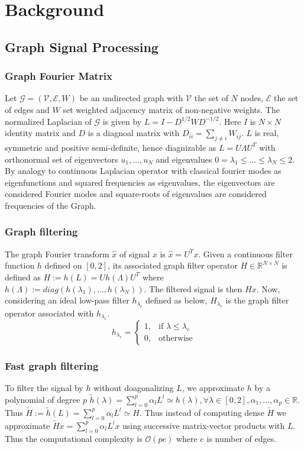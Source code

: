 \documentclass[10pt,a4paper, nocenter]{report}
\theoremstyle{definition}
\begin{document}
	\chapter{Background}
	\section{Graph Signal Processing}
	\subsection*{Graph Fourier Matrix}
	Let $\mathcal{G} = (\mathcal{V},\mathcal{E}, W)$ be an undirected graph with $\mathcal{V}$ the set of $N$ nodes, $\mathcal{E}$ the set of edges and $W$ set weighted adjacency matrix of non-negative weights. The normalized Laplacian of $\mathcal{G}$ is given by $L=I-D^{1/2}WD^{-1/2}$. Here $I$ is $N\times N$ identity matrix and $D$ is a diagnoal matrix with $D_{ii} = \sum_{j\neq i}W_{ij}$. $L$ is real, symmetric and positive semi-definite, hence diagnizable as $L=U\Lambda U^T$ with orthonormal set of eigenvectors $u_1,\dots,u_N$ and eigenvalues $0=\lambda_1 \le \dots \le \lambda_N \le 2$. By analogy to continuous Laplacian operator with classical fourier modes as eigenfunctions and squared frequencies as eigenvalues, the eigenvectors are considered Fourier modes and square-roots of eigenvalues are considered frequencies of the Graph. 

	\subsection*{Graph filtering}
	The graph Fourier transform $\hat{x}$ of signal $x$ is $\hat{x} = U^Tx$. Given a continuous filter function $h$ defined on $[0,2]$, its associated graph filter operator $H\in \mathbb{R}^{N \times N}$ is defined as $H := h(L) = Uh(\Lambda)U^T$ where $h(\Lambda):=diag(h(\lambda_1), \dots, h(\lambda_N))$. The filtered signal is then $Hx$. Now, considering an ideal low-pass filter $h_{\lambda_c}$ defined as below, $H_{\lambda_c}$ is the graph filter operator associated with $h_{\lambda_c}$. 
	$$h_{\lambda_c} =  \begin{cases}1, &\text{if }\lambda \le \lambda_c \\ 0, &\text{otherwise}\end{cases}$$

	\subsection*{Fast graph filtering}
	To filter the signal by $h$ without doagonalizing $L$, we approximate $h$ by a polynomial of degree $p$ $\tilde{h}(\lambda) = \sum_{l=0}^{p}\alpha_{l}L^{l} \simeq h(\lambda), \forall \lambda \in [0,2], \alpha_1,\dots,\alpha_p \in \mathbb{R}$. Thus $\tilde{H} := \tilde{h}(L) = \sum_{l=0}^{p}\alpha_{l}L^{l} \simeq H$. Thus instead of computing dense $\tilde{H}$ we approximate $\tilde{H}x = \sum_{l=0}^{p}\alpha_{l}L^{l}x$ using successive matrix-vector products with $L$. Thus the computational complexity is $\mathcal{O}(pe)$ where $e$ is number of edges.
\end{document}
